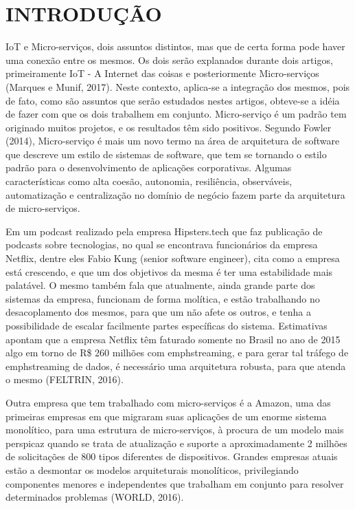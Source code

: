 \section{INTRODUÇÃO}

IoT e Micro-serviços, dois assuntos distintos, mas que de certa forma pode haver uma conexão entre os mesmos. Os dois serão explanados durante dois artigos, primeiramente IoT - A Internet das coisas e posteriormente Micro-serviços (Marques e Munif, 2017). Neste contexto, aplica-se a integração dos mesmos, pois de fato, como são assuntos que serão estudados nestes artigos, obteve-se a idéia de fazer com que os dois trabalhem em conjunto. Micro-serviço é um padrão tem originado muitos projetos, e os resultados têm sido positivos. Segundo Fowler (2014), Micro-serviço é mais um novo termo na área de arquitetura de software que descreve um estilo de sistemas de software, que tem se tornando o estilo padrão para o desenvolvimento de aplicações corporativas. Algumas características como alta coesão, autonomia, resiliência, observáveis, automatização e centralização no domínio de negócio fazem parte da arquitetura de micro-serviços. 

Em um podcast realizado pela empresa Hipsters.tech que faz publicação de podcasts sobre tecnologias, no qual se encontrava funcionários da empresa Netflix, dentre eles Fabio Kung (senior software engineer), cita como a empresa está crescendo, e que um dos objetivos da mesma é ter uma estabilidade mais palatável. O mesmo também fala que atualmente, ainda grande parte dos sistemas da empresa, funcionam de forma molítica, e estão trabalhando no desacoplamento dos mesmos, para que um não afete os outros, e tenha a possibilidade de escalar facilmente partes específicas do sistema. Estimativas apontam que a empresa Netflix têm faturado somente no Brasil no ano de 2015 algo em torno de R\$ 260 milhões com emph{streaming}, e para gerar tal tráfego de emph{streaming} de dados, é necessário uma arquitetura robusta, para que atenda o mesmo (FELTRIN, 2016).

Outra empresa que tem trabalhado com micro-serviços é a Amazon, uma das primeiras empresas em que migraram suas aplicações de um enorme sistema monolítico, para uma estrutura de micro-serviços, à procura de um modelo mais perspicaz quando se trata de atualização e suporte a aproximadamente 2 milhões de solicitações de 800 tipos diferentes de dispositivos. Grandes empresas atuais estão a desmontar os modelos arquiteturais monolíticos, privilegiando componentes menores e independentes que trabalham em conjunto para resolver determinados problemas (WORLD, 2016).

